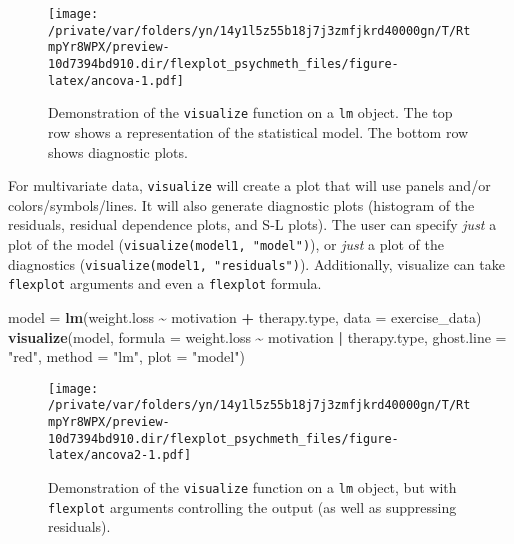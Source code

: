 \documentclass[
  english,
  man]{apa6}
\newenvironment{Shaded}{\begin{snugshade}}{\end{snugshade}}
\newcommand{\DataTypeTok}[1]{\textcolor[rgb]{0.13,0.29,0.53}{#1}}
\newcommand{\KeywordTok}[1]{\textcolor[rgb]{0.13,0.29,0.53}{\textbf{#1}}}
\newcommand{\NormalTok}[1]{#1}
\newcommand{\OperatorTok}[1]{\textcolor[rgb]{0.81,0.36,0.00}{\textbf{#1}}}
\newcommand{\StringTok}[1]{\textcolor[rgb]{0.31,0.60,0.02}{#1}}
\begin{document}
\begin{figure}
\centering
\texttt{[image: /private/var/folders/yn/14y1l5z55b18j7j3zmfjkrd40000gn/T/RtmpYr8WPX/preview-10d7394bd910.dir/flexplot\_psychmeth\_files/figure-latex/ancova-1.pdf]}
\caption{\label{fig:ancova}Demonstration of the \texttt{visualize} function on a \texttt{lm} object. The top row shows a representation of the statistical model. The bottom row shows diagnostic plots. \label{fig:ancova}}
\end{figure}

\normalsize

For multivariate data, \texttt{visualize} will create a plot that will use panels and/or colors/symbols/lines. It will also generate diagnostic plots (histogram of the residuals, residual dependence plots, and S-L plots). The user can specify \emph{just} a plot of the model (\texttt{visualize(model1,\ "model")}), or \emph{just} a plot of the diagnostics (\texttt{visualize(model1,\ "residuals")}). Additionally, visualize can take \texttt{flexplot} arguments and even a \texttt{flexplot} formula.

\small

\begin{Shaded}
\begin{Highlighting}[]
\NormalTok{model =}\StringTok{ }\KeywordTok{lm}\NormalTok{(weight.loss }\OperatorTok{\textasciitilde{}}\StringTok{ }\NormalTok{motivation }\OperatorTok{+}\StringTok{ }\NormalTok{therapy.type, }\DataTypeTok{data =}\NormalTok{ exercise\_data)}
\KeywordTok{visualize}\NormalTok{(model, }\DataTypeTok{formula =}\NormalTok{ weight.loss }\OperatorTok{\textasciitilde{}}\StringTok{ }\NormalTok{motivation }\OperatorTok{|}\StringTok{ }\NormalTok{therapy.type, }
          \DataTypeTok{ghost.line =} \StringTok{"red"}\NormalTok{, }\DataTypeTok{method =} \StringTok{"lm"}\NormalTok{, }\DataTypeTok{plot =} \StringTok{"model"}\NormalTok{)}
\end{Highlighting}
\end{Shaded}

\begin{figure}
\centering
\texttt{[image: /private/var/folders/yn/14y1l5z55b18j7j3zmfjkrd40000gn/T/RtmpYr8WPX/preview-10d7394bd910.dir/flexplot\_psychmeth\_files/figure-latex/ancova2-1.pdf]}
\caption{\label{fig:ancova2}Demonstration of the \texttt{visualize} function on a \texttt{lm} object, but with \texttt{flexplot} arguments controlling the output (as well as suppressing residuals). \label{fig:ancova2}}
\end{figure}
\end{document}
